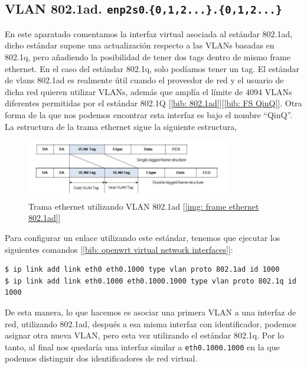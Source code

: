 \documentclass[12pt]{article}
\begin{document}
	\subsection{VLAN 802.1ad. \texttt{enp2s0}.\texttt{\{0,1,2...\}.\{0,1,2...\}}}
	\noindent En este aparatado comentamos la interfaz virtual asociada al estándar 802.1ad, dicho estándar supone una actualización respecto a las VLANs basadas en 802.1q, pero añadiendo la posibilidad de tener dos tags dentro de mismo frame ethernet. En el caso del estándar 802.1q, solo podíamos tener un tag. El estándar de vlans 802.1ad es realmente útil cuando el proveedor de red y el usuario de dicha red quieren utilizar VLANs, además que amplía el límite de 4094 VLANs diferentes permitidas por el estándar 802.1Q [\ref{bib: 802.1ad}][\ref{bib: FS QinQ}]. Otra forma de la que nos podemos encontrar esta interfaz es bajo el nombre ``QinQ''. \\
	
	\noindent La estructura de la trama ethernet sigue la siguiente estructura,
	
	\begin{figure}[h]
		\begin{center}
			\includegraphics[width=0.8\textwidth]{img/ethernet_8021ad.png}
			\caption{Trama ethernet utilizando VLAN 802.1ad [\ref{img: frame ethernet 802.1ad}]}
			\label{ethernet 802.1ad}
		\end{center}
	\end{figure}
	
	\noindent Para configurar un enlace utilizando este estándar, tenemos que ejecutar los siguientes comandos [\ref{bib: openwrt virtual network interfaces}]:
	\begin{verbatim}
$ ip link add link eth0 eth0.1000 type vlan proto 802.1ad id 1000
$ ip link add link eth0.1000 eth0.1000.1000 type vlan proto 802.1q id 1000
 	\end{verbatim}
 
 	\noindent De esta manera, lo que hacemos es asociar una primera VLAN a una interfaz de red, utilizando 802.1ad, después a esa misma interfaz con identificador, podemos asignar otra nueva VLAN, pero esta vez utilizando el estándar 802.1q. Por lo tanto, al final nos quedaría una interfaz similar a \texttt{eth0.1000.1000} en la que podemos distinguir dos identificadores de red virtual.
	
\end{document}
